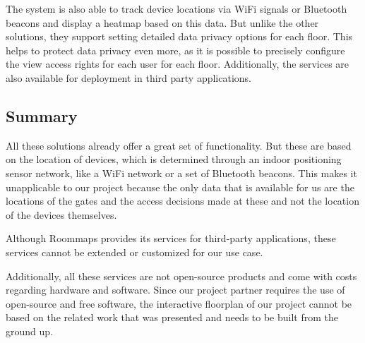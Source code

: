 The system is also able to track device locations via WiFi signals or Bluetooth beacons and display a heatmap based on this data. 
But unlike the other solutions, they support setting detailed data privacy options for each floor. This helps to protect data privacy even more, as it is possible to precisely configure the view access rights for each user for each floor. Additionally, the services are also available for deployment in third party applications.

\subsection{Summary}

All these solutions already offer a great set of functionality. But these are based on the location of devices, which is determined through an indoor positioning sensor network, like a WiFi network or a set of Bluetooth beacons. This makes it unapplicable to our project because the only data that is available for us are the locations of the gates and the access decisions made at these and not the location of the devices themselves.

Although Roommaps provides its services for third-party applications, these services cannot be extended or customized for our use case. 

Additionally, all these services are not open-source products and come with costs regarding hardware and software. Since our project partner requires the use of open-source and free software, the interactive floorplan of our project cannot be based on the related work that was presented and needs to be built from the ground up.

\clearpage